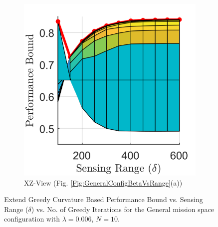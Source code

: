 \documentclass[conference]{IEEEtran}
\begin{document}
\begin{figure}[!h]
\begin{subfigure}[t]{0.17\textwidth}
        \centering
        \includegraphics[width=\textwidth]{Figures/Gen1_Exd3.png}
        \caption{XZ-View (Fig. \ref{Fig:GeneralConfigBetaVsRange}(a))}
    \end{subfigure}
    \caption{Extend Greedy Curvature Based Performance Bound vs. Sensing Range ($\delta$) vs. No. of Greedy Iterations for the General mission space configuration with $\lambda=0.006$, $N=10$.}
    \label{Fig:GeneralConfigBetaVsRangeVsiStar}
\end{figure}
\end{document}
